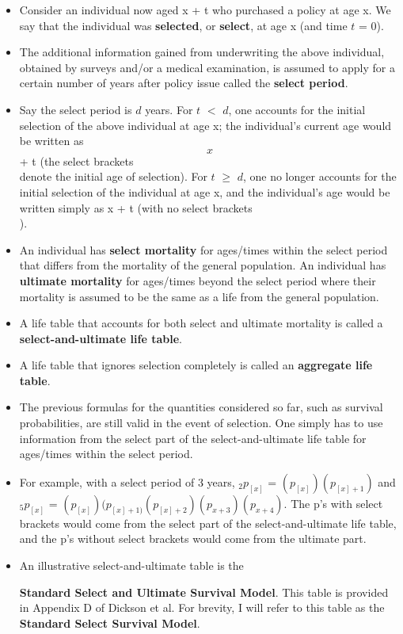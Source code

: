 \documentclass[]{book}
\begin{document}
\begin{itemize}
\item
  Consider an individual now aged x + t who purchased a policy at age x.
  We say that the individual was \textbf{selected}, or \textbf{select},
  at age x (and time \(t\) = 0).
\item
  The additional information gained from underwriting the above
  individual, obtained by surveys and/or a medical examination, is
  assumed to apply for a certain number of years after policy issue
  called the \textbf{select period}.
\item
  Say the select period is \(d\) years. For \(t\) \(<\) \(d\), one
  accounts for the initial selection of the above individual at age x;
  the individual's current age would be written as \[x\] + t (the select
  brackets \[ \] denote the initial age of selection). For \(t\) \(\ge\)
  \(d\), one no longer accounts for the initial selection of the
  individual at age x, and the individual's age would be written simply
  as x + t (with no select brackets \[ \]).
\item
  An individual has \textbf{select mortality} for ages/times within the
  select period that differs from the mortality of the general
  population. An individual has \textbf{ultimate mortality} for
  ages/times beyond the select period where their mortality is assumed
  to be the same as a life from the general population.
\item
  A life table that accounts for both select and ultimate mortality is
  called a \textbf{select-and-ultimate life table}.
\item
  A life table that ignores selection completely is called an
  \textbf{aggregate life table}.
\item
  The previous formulas for the quantities considered so far, such as
  survival probabilities, are still valid in the event of selection. One
  simply has to use information from the select part of the
  select-and-ultimate life table for ages/times within the select
  period.
\item
  For example, with a select period of 3 years, \({}_{2}p_{[x]}\) =
  \((p_{[x]})\)\((p_{[x] + 1})\) and \({}_{5}p_{[x]}\) =
  \((p_{[x]})\)\((p_{[x] + 1)}\)\((p_{[x] + 2})\)\((p_{x + 3})\)\((p_{x + 4})\).
  The p's with select brackets would come from the select part of the
  select-and-ultimate life table, and the p's without select brackets
  would come from the ultimate part.
\item
  An illustrative select-and-ultimate table is the

  \textbf{Standard Select and Ultimate Survival Model}. This table is
  provided in Appendix D of Dickson et al. For brevity, I will refer to
  this table as the \textbf{Standard Select Survival Model}.
\end{itemize}
\end{document}
